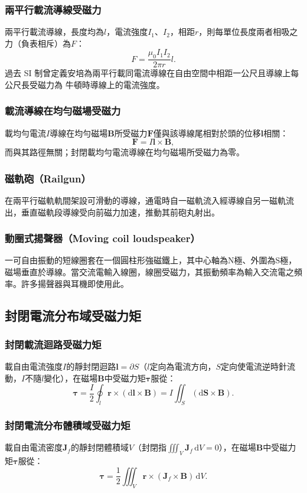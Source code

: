 \documentclass[a4paper,12pt]{report}
\begin{document}
\begin{itemize}
\subsubsection{兩平行載流導線受磁力}
兩平行載流導線，長度均為$l$，電流強度$I_1$、$I_2$，相距$r$，則每單位長度兩者相吸之力（負表相斥）為$F$：
\[F=\frac{\mu_0I_1I_2}{2\pi r}l.\]
過去 SI 制曾定義安培為兩平行載同電流導線在自由空間中相距一公尺且導線上每公尺長受磁力為  牛頓時導線上的電流強度。
\subsubsection{載流導線在均勻磁場受磁力}
載均勻電流$I$導線在均勻磁場$\mathbf{B}$所受磁力$\mathbf{F}$僅與該導線尾相對於頭的位移$\mathbf{l}$相關：
\[\mathbf{F}=I\mathbf{l}\times\mathbf{B},\]
而與其路徑無關；封閉載均勻電流導線在均勻磁場所受磁力為零。
\subsubsection{磁軌砲（Railgun）}
在兩平行磁軌軌間架設可滑動的導線，通電時自一磁軌流入經導線自另一磁軌流出，垂直磁軌段導線受向前磁力加速，推動其前砲丸射出。
\subsubsection{動圈式揚聲器（Moving coil loudspeaker）}
一可自由振動的短線圈套在一個圓柱形強磁鐵上，其中心軸為N極、外圍為S極，磁場垂直於導線。當交流電輸入線圈，線圈受磁力，其振動頻率為輸入交流電之頻率。許多揚聲器與耳機即使用此。
\subsection{封閉電流分布域受磁力矩}
\subsubsection{封閉載流迴路受磁力矩}
載自由電流強度$I$的靜封閉迴路$\mathbf{l}=\partial S$（$l$定向為電流方向，$S$定向使電流逆時針流動，$I$不隨$l$變化），在磁場$\mathbf{B}$中受磁力矩$\boldsymbol{\tau}$服從：
\[\boldsymbol{\tau}=\frac{I}{2}\oint_l\mathbf{r}\times(\mathrm{d}\mathbf{l}\times\mathbf{B})=I\iint_S(\mathrm{d}\mathbf{S}\times\mathbf{B}).\]
\subsubsection{封閉電流分布體積域受磁力矩}
載自由電流密度$\mathbf{J}_f$的靜封閉體積域$V$（封閉指\(\iiint_V \mathbf{J}_f \, \mathrm{d}V = 0\)），在磁場$\mathbf{B}$中受磁力矩$\boldsymbol{\tau}$服從：
\[\boldsymbol{\tau}=\frac{1}{2}\iiint_V\mathbf{r}\times(\mathbf{J}_f\times\mathbf{B})\,\mathrm{d}V.\]

\end{itemize}
\end{document}
